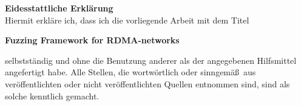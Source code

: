 












\newpage
\begin{center}
\textbf{\Large{Eidesstattliche Erklärung}}\\
\vspace{2cm}
\color{black}
Hiermit erkläre ich, dass ich die vorliegende Arbeit mit dem Titel
\vspace{1cm}

\textbf{Fuzzing Framework for RDMA-networks} \\
\vspace{1cm}
\color{black}
\end{center}
selbstständig und ohne die Benutzung anderer als der angegebenen Hilfsmittel angefertigt habe. Alle Stellen, die wortwörtlich oder sinngemä\ss\ aus veröffentlichten oder nicht veröffentlichten Quellen entnommen sind, sind als solche kenntlich gemacht.\\


